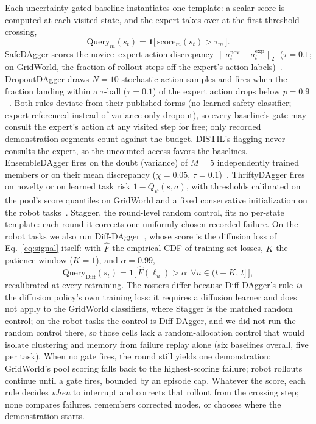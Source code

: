 \documentclass[letterpaper]{article} %
\begin{document}
Each uncertainty-gated baseline instantiates one template: a scalar score is computed at each
visited state, and the expert takes over at the first threshold crossing,
\begin{equation}
\mathrm{Query}_m(s_t)=\mathbf{1}\big[\,\mathrm{score}_m(s_t)>\tau_m\,\big].
\label{eq:query}
\end{equation}
SafeDAgger scores the novice--expert action discrepancy
$\|a^{\mathrm{nov}}_t-a^{\mathrm{exp}}_t\|_2$ ($\tau{=}0.1$;
on GridWorld, the fraction of rollout steps off the expert's action
labels)~\citep{zhang2017safedagger}. DropoutDAgger draws
$N{=}10$ stochastic action samples and fires when the fraction landing
within a $\tau$-ball ($\tau{=}0.1$) of the expert action drops below
$p{=}0.9$~\citep{menda2017dropoutdagger,gal2016dropout}. Both rules deviate
from their published forms (no learned safety classifier; expert-referenced
instead of variance-only dropout), so every baseline's gate may consult the
expert's action at any visited step for free; only recorded demonstration
segments count against the budget. DISTIL's flagging never consults the
expert, so the uncounted access favors the baselines.
EnsembleDAgger fires on the doubt (variance) of $M{=}5$ independently trained
members or on their mean discrepancy ($\chi{=}0.05$,
$\tau{=}0.1$)~\citep{menda2019ensembledagger,lakshminarayanan2017ensembles}.
ThriftyDAgger fires on novelty or on learned task risk $1-Q_\psi(s,a)$, with
thresholds calibrated on the pool's score quantiles on GridWorld and a fixed
conservative initialization on the robot
tasks~\citep{hoque2021thriftydagger}. Stagger, the round-level random
control, fits no per-state template: each round it corrects one uniformly
chosen recorded failure. On the robot tasks we also run
Diff-DAgger~\citep{lee2025diffdagger}, whose score is the diffusion loss of
Eq.~\ref{eq:signal} itself: with $\hat F$ the empirical CDF of training-set
losses, $K$ the patience window ($K{=}1$), and $\alpha{=}0.99$,
\begin{equation}
\mathrm{Query}_{\mathrm{Diff}}(s_t)=
\mathbf{1}\big[\,\hat F(\ell_u)>\alpha\ \ \forall u\in(t{-}K,\,t]\,\big],
\label{eq:diffdagger}
\end{equation}
recalibrated at every retraining. The rosters differ because Diff-DAgger's
rule \emph{is} the diffusion policy's own training loss: it requires a
diffusion learner and does not apply to the GridWorld classifiers, where
Stagger is the matched random control; on the robot tasks the control is
Diff-DAgger, and we did not run the random control there, so those cells
lack a random-allocation control that would isolate clustering and memory
from failure replay alone (six baselines overall, five per task). When no
gate fires, the round still yields one demonstration: GridWorld's pool
scoring falls back to the highest-scoring failure; robot rollouts continue
until a gate fires, bounded by an episode cap. Whatever the score, each
rule decides \emph{when} to interrupt
and corrects that rollout from the crossing step; none compares failures,
remembers corrected modes, or chooses where the demonstration starts.
\end{document}
